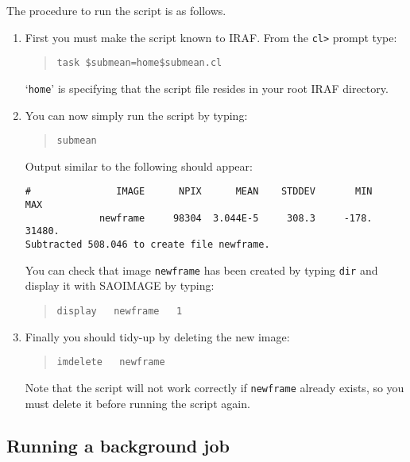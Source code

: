 \documentclass[twoside,11pt]{article}
\begin{document}
The procedure to run the script is as follows.

\begin{enumerate}

  \item First you must make the script known to IRAF.  From the \verb-cl>-
   prompt type:

  \begin{quote}
   {\tt task \$submean=home\$submean.cl}
  \end{quote}

   `{\tt home}' is specifying that the script file resides in your
   root IRAF directory.

  \item You can now simply run the script by typing:

  \begin{quote}
   {\tt submean}
  \end{quote}

   Output similar to the following should appear:

  \begin{verbatim}
#               IMAGE      NPIX      MEAN    STDDEV       MIN       MAX
             newframe     98304  3.044E-5     308.3     -178.    31480.
Subtracted 508.046 to create file newframe.
  \end{verbatim}

   You can check that image {\tt newframe} has been created by typing
   {\tt dir} and display it with SAOIMAGE by typing:

  \begin{quote}
   {\tt display ~ newframe ~ 1}
  \end{quote}

  \item Finally you should tidy-up by deleting the new image:

  \begin{quote}
   {\tt imdelete ~ newframe}
  \end{quote}

   Note that the script will not work correctly if {\tt newframe}
   already exists, so you must delete it before running the script
   again.

\end{enumerate}

\subsection{Running a background job}
\end{document}
